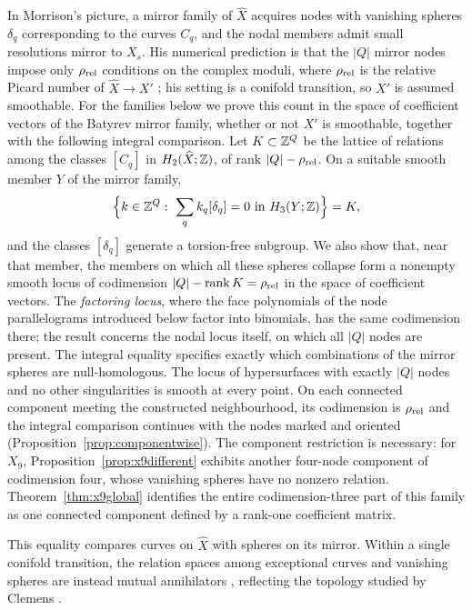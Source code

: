In Morrison's picture, a mirror family of $\widehat X$ acquires nodes with vanishing spheres $\delta_q$ corresponding
to the curves $C_q$, and the nodal members admit small resolutions mirror to $X_s$. His numerical prediction is that
the $|Q|$ mirror nodes impose only $\rho_{\rm rel}$ conditions on the complex moduli, where $\rho_{\rm rel}$ is the
relative Picard number of $\widehat X\to X'$ \cite[\S3.1]{Mor99}; his setting is a conifold transition, so $X'$ is
assumed smoothable. For the families below we prove this count in the space of coefficient vectors of the Batyrev
mirror family, whether or not $X'$ is smoothable, together with the following integral comparison. Let $K\subset\mathbb Z^Q$ be the lattice of relations among the classes $[C_q]$ in
$H_2(\widehat X;\mathbb Z)$, of rank $|Q|-\rho_{\rm rel}$. On a suitable smooth member $Y$ of the mirror family,
\begin{equation}\label{eq:intro-prediction}
\Bigl\{k\in\mathbb Z^Q:\ \sum_qk_q[\delta_q]=0\text{ in }H_3(Y;\mathbb Z)\Bigr\}=K,
\end{equation}
and the classes $[\delta_q]$ generate a torsion-free subgroup. We also show that, near that member, the members on which all these
spheres collapse form a nonempty smooth locus of codimension $|Q|-\operatorname{rank}K=\rho_{\rm rel}$ in the space of
coefficient vectors. The \emph{factoring locus}, where the face polynomials of the node parallelograms introduced
below factor into binomials, has the same codimension there; the result concerns the nodal locus itself, on which all
$|Q|$ nodes are present.
The integral equality specifies exactly which combinations of the mirror spheres are null-homologous.
The locus of hypersurfaces with exactly $|Q|$ nodes and no other singularities is smooth at every point.
On each connected component meeting the constructed neighbourhood, its codimension is $\rho_{\rm rel}$ and the
integral comparison continues with the nodes marked and oriented (Proposition~\ref{prop:componentwise}).
The component restriction is necessary: for $X_9$, Proposition~\ref{prop:x9different} exhibits another
four-node component of codimension four, whose vanishing spheres have no nonzero relation.
Theorem~\ref{thm:x9global} identifies the entire codimension-three part of this family as one connected
component defined by a rank-one coefficient matrix.

This equality compares curves on $\widehat X$ with spheres on its mirror. Within a single conifold transition,
the relation spaces among exceptional curves and vanishing spheres are instead mutual annihilators
\cite[Thm.~1.14]{LLW18}, reflecting the topology studied by Clemens \cite{Cle83}.

